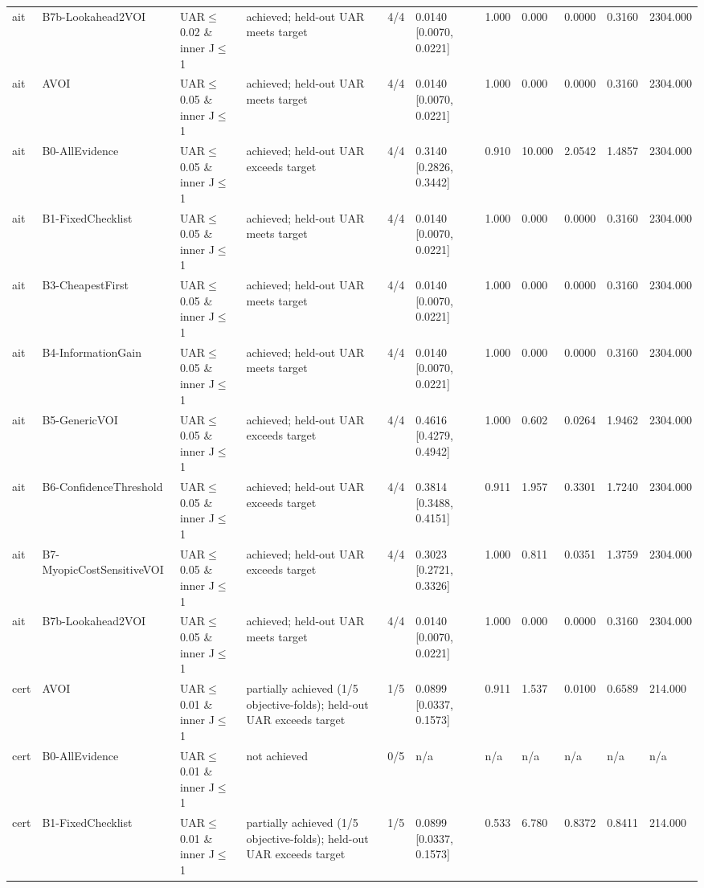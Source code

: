 \begin{table}[!ht]
{\begin{tabular}{lllllllllll}
ait & B7b-Lookahead2VOI & UAR$\le$0.02 \& inner J$\le$1 & achieved; held-out UAR meets target & 4/4 & 0.0140 [0.0070, 0.0221] & 1.000 & 0.000 & 0.0000 & 0.3160 & 2304.000 \\
ait & AVOI & UAR$\le$0.05 \& inner J$\le$1 & achieved; held-out UAR meets target & 4/4 & 0.0140 [0.0070, 0.0221] & 1.000 & 0.000 & 0.0000 & 0.3160 & 2304.000 \\
ait & B0-AllEvidence & UAR$\le$0.05 \& inner J$\le$1 & achieved; held-out UAR exceeds target & 4/4 & 0.3140 [0.2826, 0.3442] & 0.910 & 10.000 & 2.0542 & 1.4857 & 2304.000 \\
ait & B1-FixedChecklist & UAR$\le$0.05 \& inner J$\le$1 & achieved; held-out UAR meets target & 4/4 & 0.0140 [0.0070, 0.0221] & 1.000 & 0.000 & 0.0000 & 0.3160 & 2304.000 \\
ait & B3-CheapestFirst & UAR$\le$0.05 \& inner J$\le$1 & achieved; held-out UAR meets target & 4/4 & 0.0140 [0.0070, 0.0221] & 1.000 & 0.000 & 0.0000 & 0.3160 & 2304.000 \\
ait & B4-InformationGain & UAR$\le$0.05 \& inner J$\le$1 & achieved; held-out UAR meets target & 4/4 & 0.0140 [0.0070, 0.0221] & 1.000 & 0.000 & 0.0000 & 0.3160 & 2304.000 \\
ait & B5-GenericVOI & UAR$\le$0.05 \& inner J$\le$1 & achieved; held-out UAR exceeds target & 4/4 & 0.4616 [0.4279, 0.4942] & 1.000 & 0.602 & 0.0264 & 1.9462 & 2304.000 \\
ait & B6-ConfidenceThreshold & UAR$\le$0.05 \& inner J$\le$1 & achieved; held-out UAR exceeds target & 4/4 & 0.3814 [0.3488, 0.4151] & 0.911 & 1.957 & 0.3301 & 1.7240 & 2304.000 \\
ait & B7-MyopicCostSensitiveVOI & UAR$\le$0.05 \& inner J$\le$1 & achieved; held-out UAR exceeds target & 4/4 & 0.3023 [0.2721, 0.3326] & 1.000 & 0.811 & 0.0351 & 1.3759 & 2304.000 \\
ait & B7b-Lookahead2VOI & UAR$\le$0.05 \& inner J$\le$1 & achieved; held-out UAR meets target & 4/4 & 0.0140 [0.0070, 0.0221] & 1.000 & 0.000 & 0.0000 & 0.3160 & 2304.000 \\
cert & AVOI & UAR$\le$0.01 \& inner J$\le$1 & partially achieved (1/5 objective-folds); held-out UAR exceeds target & 1/5 & 0.0899 [0.0337, 0.1573] & 0.911 & 1.537 & 0.0100 & 0.6589 & 214.000 \\
cert & B0-AllEvidence & UAR$\le$0.01 \& inner J$\le$1 & not achieved & 0/5 & n/a & n/a & n/a & n/a & n/a & n/a \\
cert & B1-FixedChecklist & UAR$\le$0.01 \& inner J$\le$1 & partially achieved (1/5 objective-folds); held-out UAR exceeds target & 1/5 & 0.0899 [0.0337, 0.1573] & 0.533 & 6.780 & 0.8372 & 0.8411 & 214.000 \\

\end{tabular}}
\end{table}
